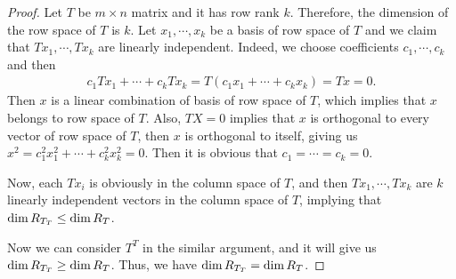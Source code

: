 \documentclass[10pt]{book}
\theoremstyle{definition}
\numberwithin{equation}{chapter}
\begin{document}
\begin{proof}
Let $T$ be $m\times n$ matrix and it has row rank $k$. Therefore, the dimension of the row space of $T$ is $k$. Let $x_1,\cdots,x_k$ be a basis of row space of $T$ and we claim that $Tx_1,\cdots, Tx_k$ are linearly independent. Indeed, we choose coefficients $c_1,\cdots,c_k$ and then 
\begin{align*}
    c_1 Tx_1 + \cdots + c_k Tx_k = T(c_1x_1 +\cdots + c_kx_k) = Tx = 0.
\end{align*}
Then $x$ is a linear combination of basis of row space of $T$, which implies that $x$ belongs to row space of $T$. Also, $TX = 0$ implies that $x$ is orthogonal to every vector of row space of $T$, then $x$ is orthogonal to itself, giving us $x^2 = c_1^2 x_1^2 + \cdots + c_k^2 x_k^2 = 0$. Then it is obvious that $c_1 = \cdots = c_k = 0$.

Now, each $Tx_i$ is obviously in the column space of $T$, and then $Tx_1,\cdots, Tx_k$ are $k$ linearly independent vectors in the column space of $T$, implying that ${\rm dim}\, R_{T_T}\leq {\rm dim}\,R_T$. 

Now we can consider $T^T$ in the similar argument, and it will give us ${\rm dim}\, R_{T_T}\geq {\rm dim}\,R_T$. Thus, we have ${\rm dim}\, R_{T_T} = {\rm dim}\,R_T$. 
\end{proof}

\medskip
\end{document}
